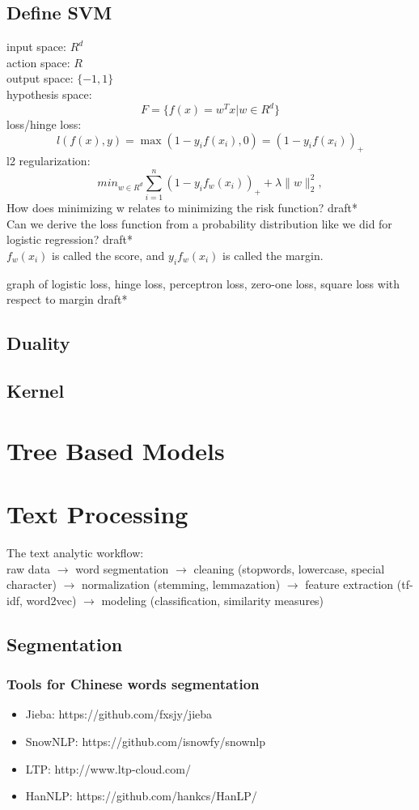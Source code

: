 \documentclass{report}
\begin{document}
\section{Define SVM}

{\noindent input space: $R^d$} \\
action space: $R$ \\
output space: $\{-1, 1\}$\\
hypothesis space: \[ F = \{ f(x) = w^T x | w \in R^d\}\]
loss/hinge loss: \[ l\left( f(x), y \right) = \max(1 - y_if(x_i), 0) = \left( 1 - y_if(x_i) \right)_+ \]
l2 regularization: \[
	min_{w \in R^d}\sum_{i=1}^{n} \left( 1 -y_if_w(x_i) \right)_+ + \lambda\|w\|_2^2 
,\] 
How does minimizing w relates to minimizing the risk function? draft*\\
Can we derive the loss function from a probability distribution like we did for logistic regression? draft*\\
$f_w(x_i)$ is called the score, and $y_if_w(x_i)$ is called the margin.

graph of logistic loss, hinge loss, perceptron loss, zero-one loss, square loss with respect to margin draft*
\section{Duality}
\section{Kernel}
\chapter{Tree Based Models}

\chapter{Text Processing}
The text analytic workflow: \\ \linebreak
raw data $\rightarrow$ word segmentation $\rightarrow$ cleaning (stopwords, lowercase, special character) $\rightarrow$ normalization (stemming, lemmazation) $\rightarrow$ feature extraction (tf-idf, word2vec) $\rightarrow$ modeling (classification, similarity measures)

\section{Segmentation}
\subsection{Tools for Chinese words segmentation}
\begin{itemize}
	\item Jieba: https://github.com/fxsjy/jieba
	\item SnowNLP: https://github.com/isnowfy/snownlp
	\item LTP: http://www.ltp-cloud.com/
	\item HanNLP: https://github.com/hankcs/HanLP/
\end{itemize}
\end{document}
